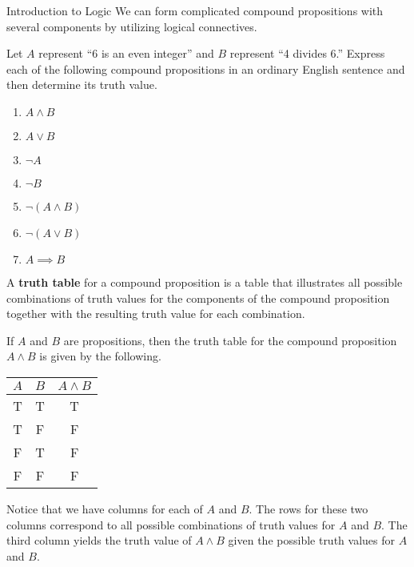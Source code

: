 \begin{section}{Introduction to Logic}
We can form complicated compound propositions with several components by utilizing logical connectives.


\begin{problem}\label{prob:translations}
Let $A$ represent ``6 is an even integer'' and $B$ represent ``4 divides 6.''  Express each of the following compound propositions in an ordinary English sentence and then determine its truth value.
\begin{enumerate}[label=\textrm{(\alph*)}]
  \item $A \wedge B$
  \item $A \vee B$
  \item $\neg A$
  \item $\neg B$
  \item $\neg (A \wedge B)$
  \item $\neg (A \vee B)$
  \item $A \implies B$
\end{enumerate}
\end{problem}

\begin{definition}
A \textbf{truth table} for a compound proposition is a table that illustrates all possible combinations of truth values for the components of the compound proposition together with the resulting truth value for each combination. 
\end{definition}

\begin{example}
If $A$ and $B$ are propositions, then the truth table for the compound proposition $A\wedge B$ is given by the following.
\begin{center}
\begin{tabular}{@{}ccc@{}}
\toprule
$A$  &  $B$ & $A \wedge B$  \\
\midrule
T & T & T  \\ 
T & F & F  \\ 
F & T & F  \\ 
F & F & F  \\
\bottomrule
\end{tabular}
\end{center}
Notice that we have columns for each of $A$ and $B$.  The rows for these two columns correspond to all possible combinations of truth values for $A$ and $B$.  The third column yields the truth value of $A\wedge B$ given the possible truth values for $A$ and $B$.
\end{example}


\end{section}
